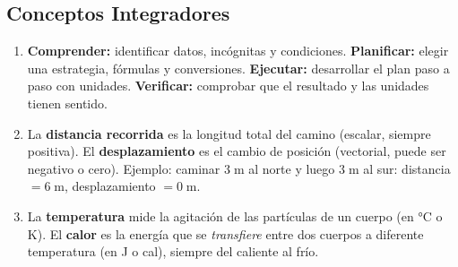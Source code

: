 \documentclass[12pt, letterpaper]{article}
\begin{document}
  \newpage

  \subsection*{Conceptos Integradores}

  \begin{enumerate}[leftmargin=*, label=\textbf{\arabic*.}]
    \item \textbf{Comprender:} identificar datos, incógnitas y condiciones. \textbf{Planificar:} elegir una estrategia, fórmulas y conversiones. \textbf{Ejecutar:} desarrollar el plan paso a paso con unidades. \textbf{Verificar:} comprobar que el resultado y las unidades tienen sentido.

    \item La \textbf{distancia recorrida} es la longitud total del camino (escalar, siempre positiva). El \textbf{desplazamiento} es el cambio de posición (vectorial, puede ser negativo o cero). Ejemplo: caminar $3\;\text{m}$ al norte y luego $3\;\text{m}$ al sur: distancia $= 6\;\text{m}$, desplazamiento $= 0\;\text{m}$.

    \item La \textbf{temperatura} mide la agitación de las partículas de un cuerpo (en °C o K). El \textbf{calor} es la energía que se \emph{transfiere} entre dos cuerpos a diferente temperatura (en J o cal), siempre del caliente al frío.
  \end{enumerate}

\fi
\end{document}
